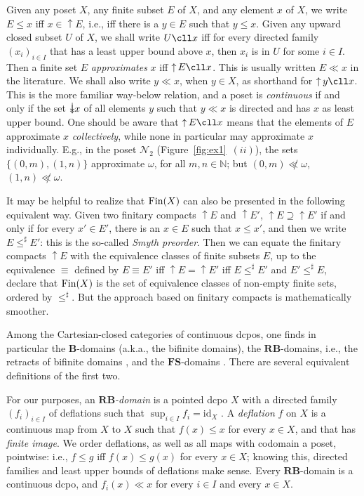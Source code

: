 \documentclass{LMCS}
\newcommand\nat{\mathbb{N}}
\newcommand\upc{\mathop{\uparrow}\nolimits}
\newcommand\B{\mathbf{B}}
\newcommand\RB{\mathbf{RB}}
\newcommand\FS{\mathbf{FS}}
\newcommand{\identity}[1]{\mathrm{id}_{#1}}
\begin{document}
Given any poset $X$, any finite subset $E$ of $X$, and any element $x$
of $X$, we write $E \leq x$ iff $x \in \upc E$, i.e., iff there is a
$y \in E$ such that $y\leq x$.  Given any upward closed subset $U$ of
$X$, we shall write $U \cll x$ iff for every directed family
${(x_i)}_{i \in I}$ that has a least upper bound above $x$, then $x_i$
is in $U$ for some $i \in I$.  Then a finite set $E$ {\em
  approximates\/} $x$ iff $\upc E \cll x$.  This is usually written $E
\ll x$ in the literature.
We shall also write $y \ll x$, when $y \in X$, as shorthand for $\upc
y \cll x$.  This is the more familiar way-below relation, and a poset
is {\em continuous\/} if and only if the set $\ddarrow x$ of all
elements $y$ such that $y \ll x$ is directed and has $x$ as least
upper bound.  One should be aware that $\upc E \cll x$ means that the
elements of $E$ approximate $x$ {\em collectively\/}, while none in
particular may approximate $x$ individually.  E.g., in the poset
$\mathcal N_2$ (Figure~\ref{fig:ex1}~$(ii)$), the sets $\{(0, m), (1,
n)\}$ approximate $\omega$, for all $m, n \in \nat$; but $(0, m) \not
\ll \omega$, $(1, n) \not\ll \omega$.

It may be helpful to realize that $\mathop{\text{Fin}} (X)$ can also be presented in
the following equivalent way.  Given two finitary compacts $\upc E$
and $\upc E'$, $\upc E \supseteq \upc E'$ if and only if for every $x'
\in E'$, there is an $x \in E$ such that $x \leq x'$, and then we
write $E \leq^\sharp E'$: this is the so-called {\em Smyth
  preorder\/}.  Then we can equate the finitary compacts $\upc
E$ with the equivalence classes of finite subsets $E$, up to the
equivalence $\equiv$ defined by $E \equiv E'$ iff $\upc E = \upc E'$
iff $E \leq^\sharp E'$ and $E' \leq^\sharp E$, declare that $\mathop{\text{Fin}} (X)$
is the set of equivalence classes of non-empty finite sets, ordered by
$\leq^\sharp$.  But the approach based on finitary compacts is
mathematically smoother.

Among the Cartesian-closed categories of continuous dcpos, one finds
in particular the $\B$-domains (a.k.a., the bifinite domains), the
$\RB$-domains, i.e., the retracts of bifinite domains
\cite[Section~4.2.1]{AJ:domains}, and the $\FS$-domains
\cite[Section~4.2.2]{AJ:domains}\cite[Section~II.2]{GHKLMS:contlatt}.
There are several equivalent definitions of the first two.

For our purposes, an {\em $\RB$-domain\/} is a pointed dcpo $X$ with a
directed family ${(f_i)}_{i \in I}$ of deflations such that $\sup_{i
  \in I} f_i = \identity X$ \cite[Exercise~4.3.11(9)]{AJ:domains}.  A
{\em deflation\/} $f$ on $X$ is a continuous map from $X$ to $X$ such
that $f (x) \leq x$ for every $x \in X$, and that has {\em finite
  image\/}.  We order deflations, as well as all maps with codomain a
poset, pointwise: i.e., $f \leq g$ iff $f (x) \leq g (x)$ for every $x
\in X$; knowing this, directed families and least upper bounds of
deflations make sense.  Every $\RB$-domain is a continuous dcpo, and
$f_i (x) \ll x$ for every $i \in I$ and every $x \in X$.
\end{document}
